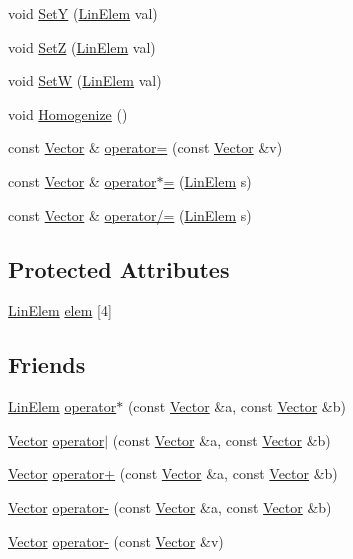 \begin{DoxyCompactItemize}
void \hyperlink{a00152_aacf901bd9ec11f0fe2b49313cabaa28a}{Set\-Y} (\hyperlink{a00234_a4f6e9fb2a8330a392e7819d1aef8881a}{Lin\-Elem} val)
\item 
void \hyperlink{a00152_a822cdd636775557ece570c97558abeec}{Set\-Z} (\hyperlink{a00234_a4f6e9fb2a8330a392e7819d1aef8881a}{Lin\-Elem} val)
\item 
void \hyperlink{a00152_ac6ff28126ffa2291993a948685484076}{Set\-W} (\hyperlink{a00234_a4f6e9fb2a8330a392e7819d1aef8881a}{Lin\-Elem} val)
\item 
void \hyperlink{a00152_ace1304e5f972bcde7ac39e664508c7c2}{Homogenize} ()
\item 
const \hyperlink{a00152}{Vector} \& \hyperlink{a00152_a3d68607e70d0cce53928736e8fab69fb}{operator=} (const \hyperlink{a00152}{Vector} \&v)
\item 
const \hyperlink{a00152}{Vector} \& \hyperlink{a00152_af84484bf470cef647099ca7961b5a979}{operator$\ast$=} (\hyperlink{a00234_a4f6e9fb2a8330a392e7819d1aef8881a}{Lin\-Elem} s)
\item 
const \hyperlink{a00152}{Vector} \& \hyperlink{a00152_a0e976334dca50d0e45d915fb0ce02d52}{operator/=} (\hyperlink{a00234_a4f6e9fb2a8330a392e7819d1aef8881a}{Lin\-Elem} s)
\end{DoxyCompactItemize}
\subsection*{Protected Attributes}
\begin{DoxyCompactItemize}
\item 
\hyperlink{a00234_a4f6e9fb2a8330a392e7819d1aef8881a}{Lin\-Elem} \hyperlink{a00152_a9512f38257bc1e0448922e7a2e914ee0}{elem} \mbox{[}4\mbox{]}
\end{DoxyCompactItemize}
\subsection*{Friends}
\begin{DoxyCompactItemize}
\item 
\hyperlink{a00234_a4f6e9fb2a8330a392e7819d1aef8881a}{Lin\-Elem} \hyperlink{a00152_a917e8a4151508acffa01baa49c4679fe}{operator$\ast$} (const \hyperlink{a00152}{Vector} \&a, const \hyperlink{a00152}{Vector} \&b)
\item 
\hyperlink{a00152}{Vector} \hyperlink{a00152_ab72c91799ead69c7d3348998ad6f337a}{operator$\vert$} (const \hyperlink{a00152}{Vector} \&a, const \hyperlink{a00152}{Vector} \&b)
\item 
\hyperlink{a00152}{Vector} \hyperlink{a00152_a53d6a19cb17320a43a60e4356f80c205}{operator+} (const \hyperlink{a00152}{Vector} \&a, const \hyperlink{a00152}{Vector} \&b)
\item 
\hyperlink{a00152}{Vector} \hyperlink{a00152_a316d381a8ae7de1d299f2131a042a349}{operator-\/} (const \hyperlink{a00152}{Vector} \&a, const \hyperlink{a00152}{Vector} \&b)
\item 
\hyperlink{a00152}{Vector} \hyperlink{a00152_ac7a74ab9b64a6ddb03e7d25895c2699d}{operator-\/} (const \hyperlink{a00152}{Vector} \&v)
\end{DoxyCompactItemize}


